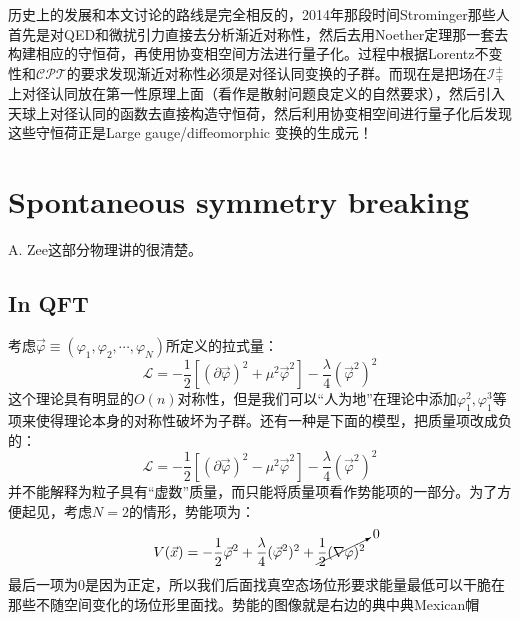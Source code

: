 历史上的发展和本文讨论的路线是完全相反的，2014年那段时间Strominger那些人首先是对QED和微扰引力直接去分析渐近对称性，然后去用Noether定理那一套去构建相应的守恒荷，再使用协变相空间方法进行量子化。过程中根据Lorentz不变性和$\mathcal{CPT}$的要求发现渐近对称性必须是对径认同变换的子群。而现在是把场在$\mathcal{I}^\pm_\mp$上对径认同放在第一性原理上面（看作是散射问题良定义的自然要求），然后引入天球上对径认同的函数去直接构造守恒荷，然后利用协变相空间进行量子化后发现这些守恒荷正是Large gauge/diffeomorphic 变换的生成元！

\section{Spontaneous symmetry breaking}
A. Zee\cite{Zee:2010qce}这部分物理讲的很清楚。
\subsection{In QFT}
考虑$\vec{\varphi}\equiv(\varphi_1,\varphi_2,\cdots,\varphi_N)$所定义的拉式量：
\begin{equation}
	\mathcal{L}=-\frac{1}{2}\left[(\partial\vec{\varphi})^2+\mu^2\vec{\varphi}^2\right]-\frac{\lambda}{4}(\vec{\varphi}^2)^2
\end{equation}
这个理论具有明显的$O(n)$对称性，但是我们可以“人为地”在理论中添加$\varphi_1^2,\varphi_1^3$等项来使得理论本身的对称性破坏为子群。还有一种是下面的模型，把质量项改成负的：
\begin{equation}
	\mathcal{L}=-\frac{1}{2}\left[(\partial\vec{\varphi})^2-\mu^2\vec{\varphi}^2\right]-\frac{\lambda}{4}(\vec{\varphi}^2)^2
\end{equation}
并不能解释为粒子具有“虚数”质量，而只能将质量项看作势能项的一部分。为了方便起见，考虑$N=2$的情形，势能项为：
\begin{equation}
	V(\vec{x})=-\frac{1}{2}{\vec{\varphi}}^2+\frac{\lambda}{4}(\vec{\varphi}^2)^2+\cancelto{0}{\frac{1}{2}(\nabla\varphi)^2}
\end{equation}
最后一项为0是因为正定，所以我们后面找真空态场位形要求能量最低可以干脆在那些不随空间变化的场位形里面找。势能的图像就是右边的典中典Mexican帽
